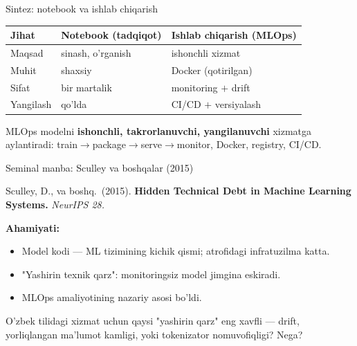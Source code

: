 \documentclass[aspectratio=169,11pt]{beamer}
\begin{document}
\begin{frame}{Sintez: notebook va ishlab chiqarish}
  \begin{center}\small
  \begin{tabular}{p{3.2cm}p{3.6cm}p{4.0cm}}
    \toprule
    \textbf{Jihat} & \textbf{Notebook (tadqiqot)} & \textbf{Ishlab chiqarish (MLOps)} \\
    \midrule
    Maqsad & sinash, o'rganish & ishonchli xizmat \\
    Muhit & shaxsiy & Docker (qotirilgan) \\
    Sifat & bir martalik & monitoring $+$ drift \\
    Yangilash & qo'lda & CI/CD $+$ versiyalash \\
    \bottomrule
  \end{tabular}
  \end{center}
  \vspace{4pt}
  \begin{tcolorbox}[okbox,title=Asosiy g'oya,top=2pt,bottom=2pt]
    \footnotesize
    MLOps modelni \textbf{ishonchli, takrorlanuvchi, yangilanuvchi} xizmatga
    aylantiradi: train$\to$package$\to$serve$\to$monitor, Docker, registry, CI/CD.
  \end{tcolorbox}
\end{frame}

\begin{frame}{Seminal manba: Sculley va boshqalar (2015)}
  \begin{tcolorbox}[defbox,title=Manba]
    \small
    Sculley, D., va boshq.\ (2015). \textbf{Hidden Technical Debt in Machine
    Learning Systems.} \textit{NeurIPS 28.}
  \end{tcolorbox}
  \vspace{5pt}
  \textbf{Ahamiyati:}
  \begin{itemize}\small\setlength\itemsep{3pt}
    \item Model kodi --- ML tizimining kichik qismi; atrofidagi infratuzilma katta.
    \item "Yashirin texnik qarz": monitoringsiz model jimgina eskiradi.
    \item MLOps amaliyotining nazariy asosi bo'ldi.
  \end{itemize}
  \vspace{5pt}
  \begin{tcolorbox}[warnbox,title=Muhokama savoli]
    \small
    O'zbek tilidagi xizmat uchun qaysi "yashirin qarz" eng xavfli --- drift,
    yorliqlangan ma'lumot kamligi, yoki tokenizator nomuvofiqligi? Nega?
  \end{tcolorbox}
\end{frame}
\end{document}
